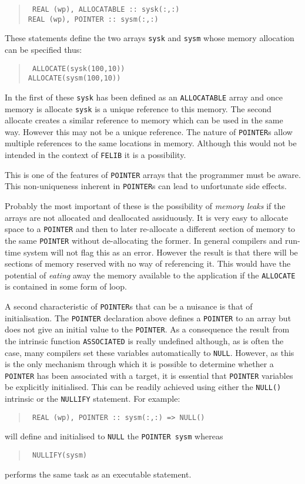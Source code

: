 \documentclass[a4paper,titlepage,11pt]{article}
\begin{document}
\begin{quote}
\tt\source
REAL (wp), ALLOCATABLE :: sysk(:,:)\\
REAL (wp), POINTER :: sysm(:,:)
\end{quote}

These statements define the two arrays {\tt sysk} and {\tt sysm} whose memory
allocation can be specified thus:

\begin{quote}
\tt\source
ALLOCATE(sysk(100,10))\\
ALLOCATE(sysm(100,10))
\end{quote}
In the first of these {\tt sysk} has been defined as an {\tt ALLOCATABLE} array and
once memory is allocate {\tt sysk} is a unique reference to this memory. The second
allocate creates a similar reference to memory which can be used in the same way.
However this may not be a unique reference. The nature of {\tt POINTER}s allow
multiple references to the same locations in memory. Although this would not be
intended in the context of {\tt FELIB} it is a possibility.

This is one of the features of {\tt POINTER} arrays that the programmer must be
aware. This non-uniqueness inherent in {\tt POINTER}s can lead to unfortunate
side effects.

Probably the most important of these is the possibility of {\it memory leaks} if the 
arrays are not allocated and deallocated assiduously. It is very easy to allocate space  
to a {\tt POINTER} and then to later re-allocate a different section of memory to the 
same {\tt POINTER} without de-allocating the former. In general compilers and run-time 
system will not flag this as an error. 
However the result is that there will be sections of memory reserved
with no way of referencing it. This would have the potential of {\it eating} away
the memory available to the application if the {\tt ALLOCATE} is contained in some form
of loop. 

A second characteristic of {\tt POINTER}s that can be a nuisance is that of initialisation. 
The {\tt POINTER} declaration above defines a {\tt POINTER} to an array but does not give 
an initial value to the {\tt POINTER}. As a consequence the result from the intrinsic 
function {\tt ASSOCIATED} is really undefined although, as is often the case, many compilers
set these variables automatically to {\tt NULL}. However, as this is the only mechanism 
through which it is possible to determine whether a {\tt POINTER} has been associated 
with a target, it is essential that {\tt POINTER} variables be explicitly initialised. 
This can be readily achieved using either the {\tt NULL()} intrinsic or the {\tt NULLIFY} 
statement. For example:
\begin{quote}
\tt\source
REAL (wp), POINTER :: sysm(:,:) => NULL()
\end{quote}
will define and initialised to {\tt NULL} the {\tt POINTER sysm} whereas
\begin{quote}
\tt\source
NULLIFY(sysm)
\end{quote}
performs the same task as an executable statement.
\end{document}
